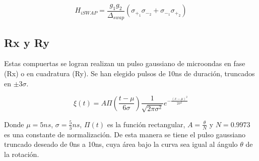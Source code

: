 \begin{equation}
    H_{iSWAP} = \frac{g_1 g_2}{\Delta_{swap}} (\sigma_{+_1} \sigma_{-_2} + \sigma_{-_1} \sigma_{+_2})
\end{equation}

\subsection{Rx y Ry}

Estas compuertas se logran realizan un pulso gaussiano de microondas en fase (Rx) o en cuadratura (Ry). Se han elegido pulsos de 10ns de duración, truncados en $\pm 3 \sigma$.

\begin{equation}
    \xi(t) = A \Pi\left(\frac{t-\mu}{6\sigma}\right) \frac{1}{\sqrt{2 \pi \sigma^2}} e^{-\frac{(x-\mu)^2}{2 \sigma^2}}
\end{equation}

Donde $\mu = 5ns$, $\sigma = \frac{5}{3} ns$, $\Pi(t)$ es la función rectangular, $A = \frac{\theta}{N}$ y $N = 0.9973$ es una constante de normalización. De esta manera se tiene el pulso gaussiano truncado deseado de 0ns a 10ns, cuya área bajo la curva sea igual al ángulo $\theta$ de la rotación.

